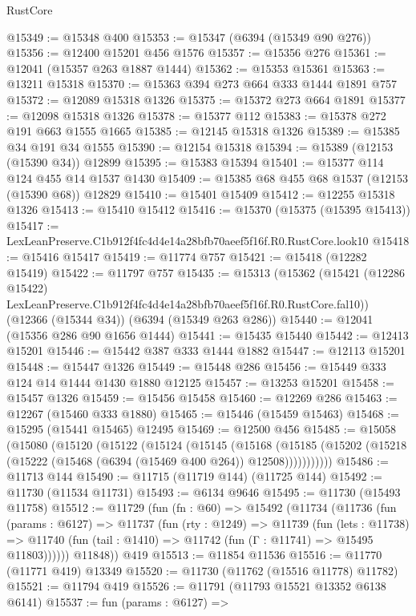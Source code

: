 \begin{lexlean}{RustCore}
\begin{coremodule}
@15349 := @15348 @400
@15353 := @15347 (@6394 (@15349 @90 @276))
@15356 := @12400 @15201 @456 @1576
@15357 := @15356 @276
@15361 := @12041 (@15357 @263 @1887 @1444)
@15362 := @15353 @15361
@15363 := @13211 @15318
@15370 := @15363 @394 @273 @664 @333 @1444 @1891 @757
@15372 := @12089 @15318 @1326
@15375 := @15372 @273 @664 @1891
@15377 := @12098 @15318 @1326
@15378 := @15377 @112
@15383 := @15378 @272 @191 @663 @1555 @1665
@15385 := @12145 @15318 @1326
@15389 := @15385 @34 @191 @34 @1555
@15390 := @12154 @15318
@15394 := @15389 (@12153 (@15390 @34)) @12899
@15395 := @15383 @15394
@15401 := @15377 @114 @124 @455 @14 @1537 @1430
@15409 := @15385 @68 @455 @68 @1537 (@12153 (@15390 @68)) @12829
@15410 := @15401 @15409
@15412 := @12255 @15318 @1326
@15413 := @15410 @15412
@15416 := @15370 (@15375 (@15395 @15413))
@15417 := LexLeanPreserve.C1b912f4fc4d4e14a28bfb70aeef5f16f.R0.RustCore.look10
@15418 := @15416 @15417
@15419 := @11774 @757
@15421 := @15418 (@12282 @15419)
@15422 := @11797 @757
@15435 := @15313
    (@15362
      (@15421 (@12286 @15422) LexLeanPreserve.C1b912f4fc4d4e14a28bfb70aeef5f16f.R0.RustCore.fal10))
    (@12366 (@15344 @34))
    (@6394 (@15349 @263 @286))
@15440 := @12041 (@15356 @286 @90 @1656 @1444)
@15441 := @15435 @15440
@15442 := @12413 @15201
@15446 := @15442 @387 @333 @1444 @1882
@15447 := @12113 @15201
@15448 := @15447 @1326
@15449 := @15448 @286
@15456 := @15449 @333 @124 @14 @1444 @1430 @1880 @12125
@15457 := @13253 @15201
@15458 := @15457 @1326
@15459 := @15456 @15458
@15460 := @12269 @286
@15463 := @12267 (@15460 @333 @1880)
@15465 := @15446 (@15459 @15463)
@15468 := @15295 (@15441 @15465) @12495
@15469 := @12500 @456
@15485 := @15058
    (@15080
      (@15120
        (@15122
          (@15124
            (@15145
              (@15168
                (@15185 (@15202 (@15218 (@15222 (@15468 (@6394 (@15469 @400 @264)) @12508)))))))))))
@15486 := @11713 @144
@15490 := @11715 (@11719 @144) (@11725 @144)
@15492 := @11730 (@11534 @11731)
@15493 := @6134 @9646
@15495 := @11730 (@15493 @11758)
@15512 := @11729
    (fun (fn : @60) =>
    @15492
      (@11734
        (@11736
          (fun (params : @6127) =>
          @11737
            (fun (rty : @1249) =>
            @11739
              (fun (lets : @11738) =>
              @11740 (fun (tail : @1410) => @11742 (fun (Γ : @11741) => @15495 @11803))))))
        @11848))
    @419
@15513 := @11854 @11536
@15516 := @11770 (@11771 @419) @13349
@15520 := @11730 (@11762 (@15516 @11778) @11782)
@15521 := @11794 @419
@15526 := @11791 (@11793 @15521 @13352 @6138 @6141)
@15537 := fun (params : @6127) =>

\end{coremodule}
\end{lexlean}
